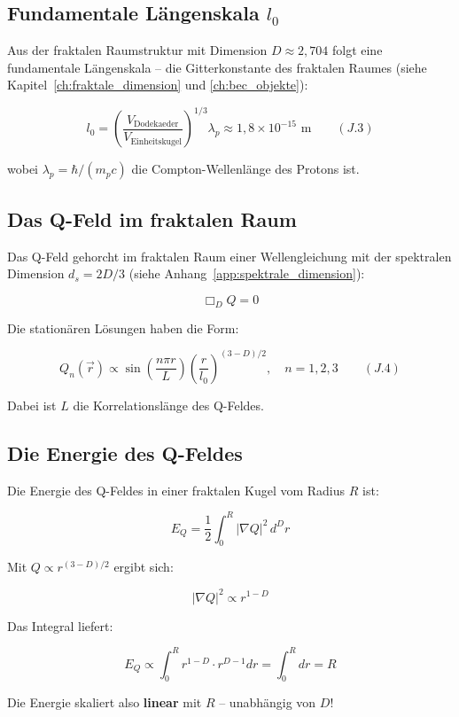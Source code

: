 \subsection{Fundamentale Längenskala \( l_0 \)}
\label{sub:neutrino_oszillation_l0}

Aus der fraktalen Raumstruktur mit Dimension \( D \approx 2,704 \) folgt eine fundamentale Längenskala – die Gitterkonstante des fraktalen Raumes (siehe Kapitel~\ref{ch:fraktale_dimension} und \ref{ch:bec_objekte}):

\[
l_0 = \left( \frac{V_{\text{Dodekaeder}}}{V_{\text{Einheitskugel}}} \right)^{1/3} \lambda_p \approx 1,8 \times 10^{-15} \text{ m} \qquad (J.3)
\]

wobei \( \lambda_p = \hbar/(m_p c) \) die Compton-Wellenlänge des Protons ist.

\subsection{Das Q-Feld im fraktalen Raum}
\label{sub:neutrino_oszillation_q_feld}

Das Q-Feld gehorcht im fraktalen Raum einer Wellengleichung mit der spektralen Dimension \( d_s = 2D/3 \) (siehe Anhang~\ref{app:spektrale_dimension}):

\[
\Box_D Q = 0
\]

Die stationären Lösungen haben die Form:

\[
Q_n(\vec{r}) \propto \sin\left(\frac{n\pi r}{L}\right) \left(\frac{r}{l_0}\right)^{(3-D)/2}, \quad n = 1,2,3 \qquad (J.4)
\]

Dabei ist \( L \) die Korrelationslänge des Q-Feldes.

\subsection{Die Energie des Q-Feldes}
\label{sub:neutrino_oszillation_energie}

Die Energie des Q-Feldes in einer fraktalen Kugel vom Radius \( R \) ist:

\[
E_Q = \frac{1}{2} \int_0^R |\nabla Q|^2 \, d^D r
\]

Mit \( Q \propto r^{(3-D)/2} \) ergibt sich:

\[
|\nabla Q|^2 \propto r^{1-D}
\]

Das Integral liefert:

\[
E_Q \propto \int_0^R r^{1-D} \cdot r^{D-1} dr = \int_0^R dr = R
\]

Die Energie skaliert also \textbf{linear} mit \( R \) – unabhängig von \( D \)!

